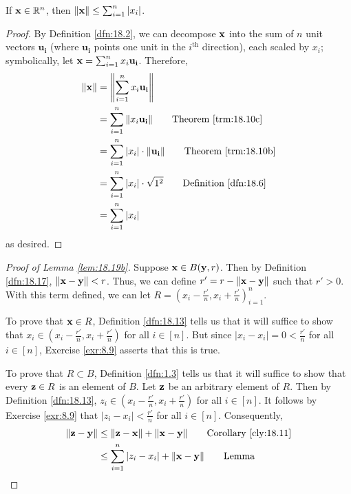 \documentclass[../main.tex]{subfiles}
\begin{document}
\begin{lemma}
\begin{enumerate}[label={\textup{(}\alph*\textup{)}},ref={\thelemma\alph*}]
        \begin{lemma*}
            If $\mathbf{x}\in\mathbb{R}^n$, then $\norm{\mathbf{x}}\leq\sum_{i=1}^n|x_i|$.
            \begin{proof}
                By Definition \ref{dfn:18.2}, we can decompose $\mathbf{x}$ into the sum of $n$ unit vectors $\mathbf{u_i}$ (where $\mathbf{u_i}$ points one unit in the $i^\text{th}$ direction), each scaled by $x_i$; symbolically, let $\mathbf{x}=\sum_{i=1}^nx_i\mathbf{u_i}$. Therefore,
                \begin{align*}
                    \norm{\x} &= \norm{\sum_{i=1}^nx_i\mathbf{u_i}}\\
                    &= \sum_{i=1}^n\norm{x_i\mathbf{u_i}}\tag*{Theorem \ref{trm:18.10c}}\\
                    &= \sum_{i=1}^n|x_i|\cdot\norm{\mathbf{u_i}}\tag*{Theorem \ref{trm:18.10b}}\\
                    &= \sum_{i=1}^n|x_i|\cdot\sqrt{1^2}\tag*{Definition \ref{dfn:18.6}}\\
                    &= \sum_{i=1}^n|x_i|
                \end{align*}
                as desired.
            \end{proof}
        \end{lemma*}
        \begin{proof}[Proof of Lemma \ref{lem:18.19b}]
            Suppose $\mathbf{x}\in B(\mathbf{y},r)$. Then by Definition \ref{dfn:18.17}, $\norm{\mathbf{x}-\mathbf{y}}<r$. Thus, we can define $r'=r-\norm{\mathbf{x}-\mathbf{y}}$ such that $r'>0$. With this term defined, we can let $R=(x_i-\frac{r'}{n},x_i+\frac{r'}{n})_{i=1}^n$.\par
            To prove that $\mathbf{x}\in R$, Definition \ref{dfn:18.13} tells us that it will suffice to show that $x_i\in(x_i-\frac{r'}{n},x_i+\frac{r'}{n})$ for all $i\in[n]$. But since $|x_i-x_i|=0<\frac{r'}{n}$ for all $i\in[n]$, Exercise \ref{exr:8.9} asserts that this is true.\par
            To prove that $R\subset B$, Definition \ref{dfn:1.3} tells us that it will suffice to show that every $\mathbf{z}\in R$ is an element of $B$. Let $\mathbf{z}$ be an arbitrary element of $R$. Then by Definition \ref{dfn:18.13}, $z_i\in(x_i-\frac{r'}{n},x_i+\frac{r'}{n})$ for all $i\in[n]$. It follows by Exercise \ref{exr:8.9} that $|z_i-x_i|<\frac{r'}{n}$ for all $i\in[n]$. Consequently,
            \begin{align*}
                \norm{\z-\y} &\leq \norm{\z-\x}+\norm{\x-\y}\tag*{Corollary \ref{cly:18.11}}\\
                &\leq \sum_{i=1}^n|z_i-x_i|+\norm{\x-\y}\tag*{Lemma}\\

\end{align*}
\end{proof}
\end{enumerate}
\end{lemma}
\end{document}
